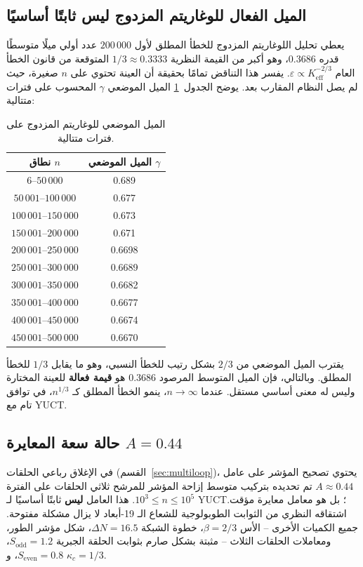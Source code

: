 \documentclass[11pt,a4paper]{article}
\begin{document}
	\subsection{الميل الفعال للوغاريتم المزدوج ليس ثابتًا أساسيًا}
	يعطي تحليل اللوغاريتم المزدوج للخطأ المطلق لأول $200\,000$ عدد أولي ميلًا متوسطًا قدره $0.3686$، وهو أكبر من القيمة النظرية $1/3 \approx 0.3333$ المتوقعة من قانون الخطأ العام $\varepsilon \propto K_{\mathrm{eff}}^{-2/3}$. يفسر هذا التناقض تمامًا بحقيقة أن العينة تحتوي على $n$ صغيرة، حيث لم يصل النظام المقارب بعد. يوضح الجدول~\ref{tab:local-slopes} الميل الموضعي $\gamma$ المحسوب على فترات متتالية:
	\begin{table}[htbp]
		\centering
		\caption{الميل الموضعي للوغاريتم المزدوج على فترات متتالية.}
		\label{tab:local-slopes}
		\begin{tabular}{c c}
			\toprule
			نطاق $n$ & الميل الموضعي $\gamma$ \\
			\midrule
			$6$--$50\,000$    & 0.689 \\
			$50\,001$--$100\,000$ & 0.677 \\
			$100\,001$--$150\,000$& 0.673 \\
			$150\,001$--$200\,000$& 0.671 \\
			$200\,001$--$250\,000$& 0.6698 \\
			$250\,001$--$300\,000$& 0.6689 \\
			$300\,001$--$350\,000$& 0.6682 \\
			$350\,001$--$400\,000$& 0.6677 \\
			$400\,001$--$450\,000$& 0.6674 \\
			$450\,001$--$500\,000$& 0.6670 \\
			\bottomrule
		\end{tabular}
	\end{table}
	يقترب الميل الموضعي من $2/3$ بشكل رتيب للخطأ النسبي، وهو ما يقابل $1/3$ للخطأ المطلق. وبالتالي، فإن الميل المتوسط المرصود $0.3686$ هو \textbf{قيمة فعالة} للعينة المختارة وليس له معنى أساسي مستقل. عندما $n\to\infty$، ينمو الخطأ المطلق كـ $n^{1/3}$، في توافق تام مع YUCT.
	
	\subsection{حالة سعة المعايرة $A=0.44$}
	في الإغلاق رباعي الحلقات (القسم~\ref{sec:multiloop})، يحتوي تصحيح المؤشر على عامل $A \approx 0.44$ تم تحديده بتركيب متوسط إزاحة المؤشر للمرشح ثلاثي الحلقات على الفترة $10^3\le n\le 10^5$. هذا العامل \textbf{ليس} ثابتًا أساسيًا لـ YUCT؛ بل هو معامل معايرة مؤقت. اشتقاقه النظري من الثوابت الطوبولوجية للشعاع الـ 19-أبعاد لا يزال مشكلة مفتوحة. جميع الكميات الأخرى – الأس $\beta=2/3$، خطوة الشبكة $\Delta N=16.5$، شكل مؤشر الطور، ومعاملات الحلقات الثلاث – مثبتة بشكل صارم بثوابت الحلقة الجبرية $S_{\mathrm{odd}}=1.2$، $S_{\mathrm{even}}=0.8$، و $\kappa_c=1/3$.
	
\end{document}

